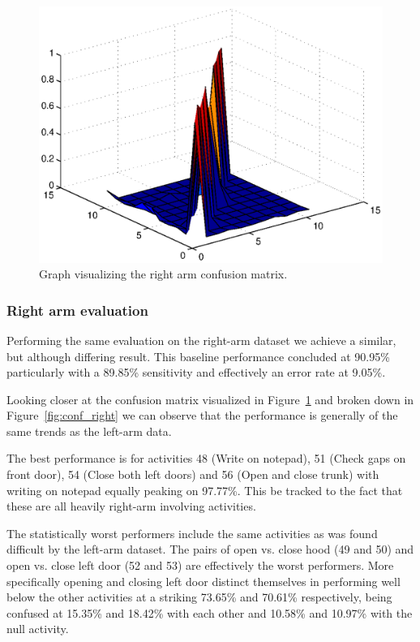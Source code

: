 \documentclass{sig-alternate}
\begin{document}
\begin{figure}
  \centering
  \includegraphics[scale=0.4]{./matlab_output/nConfkNN_right.eps}
  \caption{Graph visualizing the right arm confusion matrix.}
  \label{fig:conf_right_surf}
\end{figure}

\subsubsection{Right arm evaluation}
Performing the same evaluation on the right-arm dataset we achieve a similar, but although differing result. This baseline performance concluded at 90.95\% particularly with a 89.85\% sensitivity and effectively an error rate at 9.05\%.

Looking closer at the confusion matrix visualized in Figure~\ref{fig:conf_right_surf} and broken down in Figure~\ref{fig:conf_right} we can observe that the performance is generally of the same trends as the left-arm data. 

The best performance is for activities 48 (Write on notepad), 51 (Check gaps on front door), 54 (Close both left doors) and 56 (Open and close trunk) with writing on notepad equally peaking on 97.77\%. This be tracked to the fact that these are all heavily right-arm involving activities.

The statistically worst performers include the same activities as was found difficult by the left-arm dataset. The pairs of open vs. close hood (49 and 50) and open vs. close left door (52 and 53) are effectively the worst performers. More specifically opening and closing left door distinct themselves in performing well below the other activities at a striking 73.65\% and 70.61\% respectively, being confused at 15.35\% and 18.42\% with each other and 10.58\% and 10.97\% with the null activity.
\end{document}
